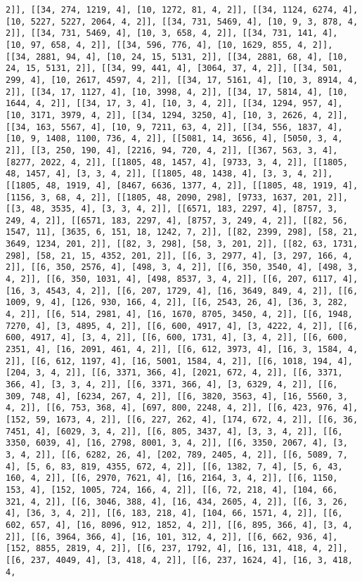\documentclass[12pt,fleqn]{article}\usepackage{../../common}
\begin{document}
\begin{verbatim}
2]], [[34, 274, 1219, 4], [10, 1272, 81, 4, 2]], [[34, 1124, 6274, 4], [10, 5227, 5227, 2064, 4, 2]], [[34, 731, 5469, 4], [10, 9, 3, 878, 4, 2]], [[34, 731, 5469, 4], [10, 3, 658, 4, 2]], [[34, 731, 141, 4], [10, 97, 658, 4, 2]], [[34, 596, 776, 4], [10, 1629, 855, 4, 2]], [[34, 2881, 94, 4], [10, 24, 15, 5131, 2]], [[34, 2881, 68, 4], [10, 24, 15, 5131, 2]], [[34, 99, 441, 4], [3064, 37, 4, 2]], [[34, 501, 299, 4], [10, 2617, 4597, 4, 2]], [[34, 17, 5161, 4], [10, 3, 8914, 4, 2]], [[34, 17, 1127, 4], [10, 3998, 4, 2]], [[34, 17, 5814, 4], [10, 1644, 4, 2]], [[34, 17, 3, 4], [10, 3, 4, 2]], [[34, 1294, 957, 4], [10, 3171, 3979, 4, 2]], [[34, 1294, 3250, 4], [10, 3, 2626, 4, 2]], [[34, 163, 5567, 4], [10, 9, 7211, 63, 4, 2]], [[34, 556, 1837, 4], [10, 9, 1408, 1100, 736, 4, 2]], [[5081, 14, 3656, 4], [5050, 3, 4, 2]], [[3, 250, 190, 4], [2216, 94, 720, 4, 2]], [[367, 563, 3, 4], [8277, 2022, 4, 2]], [[1805, 48, 1457, 4], [9733, 3, 4, 2]], [[1805, 48, 1457, 4], [3, 3, 4, 2]], [[1805, 48, 1438, 4], [3, 3, 4, 2]], [[1805, 48, 1919, 4], [8467, 6636, 1377, 4, 2]], [[1805, 48, 1919, 4], [1156, 3, 68, 4, 2]], [[1805, 48, 2090, 298], [9733, 1637, 201, 2]], [[3, 48, 3535, 4], [3, 3, 4, 2]], [[6571, 183, 2297, 4], [8757, 3, 249, 4, 2]], [[6571, 183, 2297, 4], [8757, 3, 249, 4, 2]], [[82, 56, 1547, 11], [3635, 6, 151, 18, 1242, 7, 2]], [[82, 2399, 298], [58, 21, 3649, 1234, 201, 2]], [[82, 3, 298], [58, 3, 201, 2]], [[82, 63, 1731, 298], [58, 21, 15, 4352, 201, 2]], [[6, 3, 2977, 4], [3, 297, 166, 4, 2]], [[6, 350, 2576, 4], [498, 3, 4, 2]], [[6, 350, 3540, 4], [498, 3, 4, 2]], [[6, 350, 1031, 4], [498, 8537, 3, 4, 2]], [[6, 207, 6117, 4], [16, 3, 4543, 4, 2]], [[6, 207, 1729, 4], [16, 3649, 849, 4, 2]], [[6, 1009, 9, 4], [126, 930, 166, 4, 2]], [[6, 2543, 26, 4], [36, 3, 282, 4, 2]], [[6, 514, 2981, 4], [16, 1670, 8705, 3450, 4, 2]], [[6, 1948, 7270, 4], [3, 4895, 4, 2]], [[6, 600, 4917, 4], [3, 4222, 4, 2]], [[6, 600, 4917, 4], [3, 4, 2]], [[6, 600, 1731, 4], [3, 4, 2]], [[6, 600, 2351, 4], [16, 2091, 461, 4, 2]], [[6, 612, 3973, 4], [16, 3, 1584, 4, 2]], [[6, 612, 1197, 4], [16, 5001, 1584, 4, 2]], [[6, 1018, 194, 4], [204, 3, 4, 2]], [[6, 3371, 366, 4], [2021, 672, 4, 2]], [[6, 3371, 366, 4], [3, 3, 4, 2]], [[6, 3371, 366, 4], [3, 6329, 4, 2]], [[6, 309, 748, 4], [6234, 267, 4, 2]], [[6, 3820, 3563, 4], [16, 5560, 3, 4, 2]], [[6, 753, 368, 4], [697, 800, 2248, 4, 2]], [[6, 423, 976, 4], [152, 59, 1673, 4, 2]], [[6, 227, 262, 4], [174, 672, 4, 2]], [[6, 36, 7451, 4], [6029, 3, 4, 2]], [[6, 805, 3437, 4], [3, 3, 4, 2]], [[6, 3350, 6039, 4], [16, 2798, 8001, 3, 4, 2]], [[6, 3350, 2067, 4], [3, 3, 4, 2]], [[6, 6282, 26, 4], [202, 789, 2405, 4, 2]], [[6, 5089, 7, 4], [5, 6, 83, 819, 4355, 672, 4, 2]], [[6, 1382, 7, 4], [5, 6, 43, 160, 4, 2]], [[6, 2970, 7621, 4], [16, 2164, 3, 4, 2]], [[6, 1150, 153, 4], [152, 1005, 724, 166, 4, 2]], [[6, 72, 218, 4], [104, 66, 321, 4, 2]], [[6, 3046, 388, 4], [16, 434, 2605, 4, 2]], [[6, 3, 26, 4], [36, 3, 4, 2]], [[6, 183, 218, 4], [104, 66, 1571, 4, 2]], [[6, 602, 657, 4], [16, 8096, 912, 1852, 4, 2]], [[6, 895, 366, 4], [3, 4, 2]], [[6, 3964, 366, 4], [16, 101, 312, 4, 2]], [[6, 662, 936, 4], [152, 8855, 2819, 4, 2]], [[6, 237, 1792, 4], [16, 131, 418, 4, 2]], [[6, 237, 4049, 4], [3, 418, 4, 2]], [[6, 237, 1624, 4], [16, 3, 418, 4, 
\end{verbatim}
\end{document}
